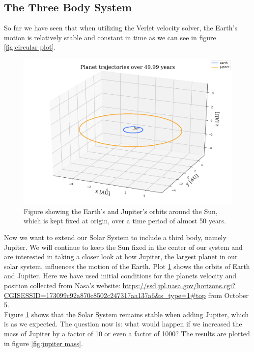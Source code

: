 \documentclass[12pt]{article}
\numberwithin{figure}{section}
\numberwithin{table}{section}
\begin{document}
\subsection{The Three Body System}
So far we have seen that when utilizing the Verlet velocity solver, the Earth's motion is relatively stable and constant in time as we can see in figure \ref{fig:circular plot}.

\begin{figure}[ht]
 \centerline{\includegraphics[scale = 0.55]{three_body_fixedsun_nasa_3D.png}}
 \caption{Figure showing the Earth's and Jupiter's orbits around the Sun, which is kept fixed at origin, over a time period of almost 50 years.}
 \label{fig:three body}
\end{figure}

\noindent Now we want to extend our Solar System to include a third body, namely Jupiter. We will continue to keep the Sun fixed in the center of our system and are interested in taking a closer look at how Jupiter, the largest planet in our solar system, influences the motion of the Earth. Plot \ref{fig:three body} shows the orbits of Earth and Jupiter. Here we have used initial conditions for the planets velocity and position collected from Nasa's website: \url{https://ssd.jpl.nasa.gov/horizons.cgi?CGISESSID=173099c92a870c8502c247317aa137a6&s_type=1#top} from October 5. \\

\noindent Figure \ref{fig:three body} shows that the Solar System remains stable when adding Jupiter, which is as we expected. The question now is: what would happen if we increased the mass of Jupiter by a factor of 10 or even a factor of 1000? The results are plotted in figure \ref{fig:jupiter mass}. \\
\end{document}
